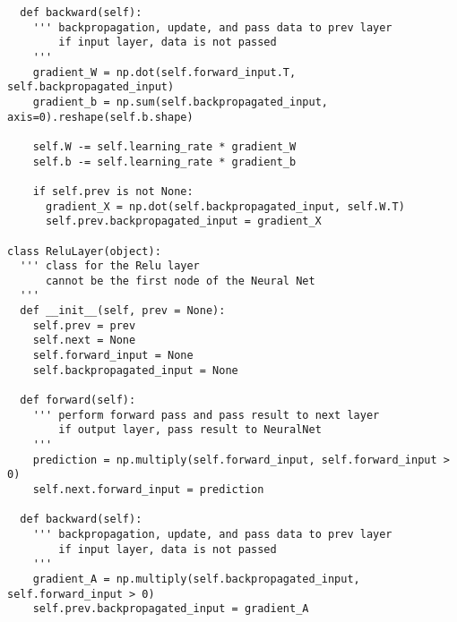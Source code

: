 \begin{verbatim}
  def backward(self):
    ''' backpropagation, update, and pass data to prev layer
        if input layer, data is not passed
    '''
    gradient_W = np.dot(self.forward_input.T, self.backpropagated_input)
    gradient_b = np.sum(self.backpropagated_input, axis=0).reshape(self.b.shape)

    self.W -= self.learning_rate * gradient_W
    self.b -= self.learning_rate * gradient_b

    if self.prev is not None:
      gradient_X = np.dot(self.backpropagated_input, self.W.T)
      self.prev.backpropagated_input = gradient_X

class ReluLayer(object):
  ''' class for the Relu layer
      cannot be the first node of the Neural Net
  '''
  def __init__(self, prev = None):
    self.prev = prev
    self.next = None
    self.forward_input = None
    self.backpropagated_input = None

  def forward(self):
    ''' perform forward pass and pass result to next layer
        if output layer, pass result to NeuralNet
    '''
    prediction = np.multiply(self.forward_input, self.forward_input > 0)
    self.next.forward_input = prediction

  def backward(self):
    ''' backpropagation, update, and pass data to prev layer
        if input layer, data is not passed
    '''
    gradient_A = np.multiply(self.backpropagated_input, self.forward_input > 0)
    self.prev.backpropagated_input = gradient_A
\end{verbatim}
